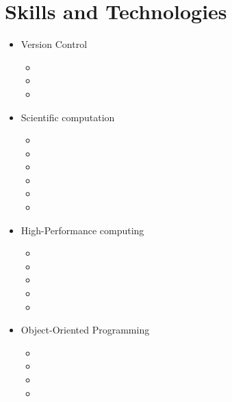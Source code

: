 \documentclass{CurriculumVitae}[10pt, draft, condensed]
\begin{document}
\section*{Skills and Technologies}

\begin{multicols}{4}
  \begin{itemize}[topsep=0pt]
    \setlength{\itemsep}{-0.3em}
  \item {\footnotesize Version Control}
    \begin{itemize}[topsep=0pt, partopsep=0pt]
      \setlength{\itemsep}{-0.3em}
    \item {}
    \item {}
    \item {}
    \end{itemize}
  \item {\footnotesize Scientific computation}
    \begin{itemize}[topsep=0pt, partopsep=0pt]
      \setlength{\itemsep}{-0.3em}
    \item {}
    \item {}
    \item {}
    \item {}
    \item {}
    \item {}
    \end{itemize}
  \item {\footnotesize High-Performance computing}
    \begin{itemize}[topsep=0pt, partopsep=0pt]
      \setlength{\itemsep}{-0.3em}
    \item {}
    \item {}
    \item {}
    \item {}
    \item {}
    \end{itemize}
  \item {\footnotesize Object-Oriented Programming}
    \begin{itemize}[topsep=0pt, partopsep=0pt]
      \setlength{\itemsep}{-0.3em}
    \item {}
    \item {}
    \item {}
    \item {}
    \end{itemize}

\end{itemize}
\end{multicols}
\end{document}
